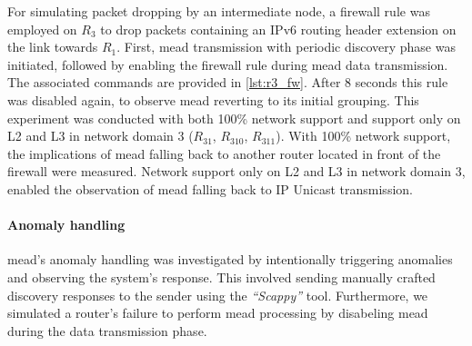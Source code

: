 For simulating packet dropping by an intermediate node, a firewall rule was
    employed on $R_3$ to drop packets containing an IPv6 routing header extension
    on the link towards $R_1$.
First, \gls{mead} transmission with periodic discovery phase was initiated,
    followed by enabling the firewall rule during \gls{mead} data transmission.
The associated commands are provided in \autoref{lst:r3_fw}.
After 8 seconds this rule was disabled again, to observe \gls{mead} reverting to
    its initial grouping.
This experiment was conducted with both 100\% network support and support only
    on L2 and L3 in network domain 3 ($R_{31}$, $R_{310}$, $R_{311}$).
With 100\% network support, the implications of \gls{mead} falling back to
    another router located in front of the firewall were measured.
Network support only on L2 and L3 in network domain 3, enabled the
    observation of \gls{mead} falling back to IP Unicast transmission.

\paragraph{Anomaly handling} %
\label{par:Anomaly handling}
\gls{mead}'s anomaly handling was investigated by intentionally triggering
    anomalies and observing the system's response.
This involved sending manually crafted discovery responses to the sender using
    the \textit{``Scappy''} tool.
Furthermore, we simulated a router's failure to perform \gls{mead} processing by
    disabeling \gls{mead} during the data transmission phase.
